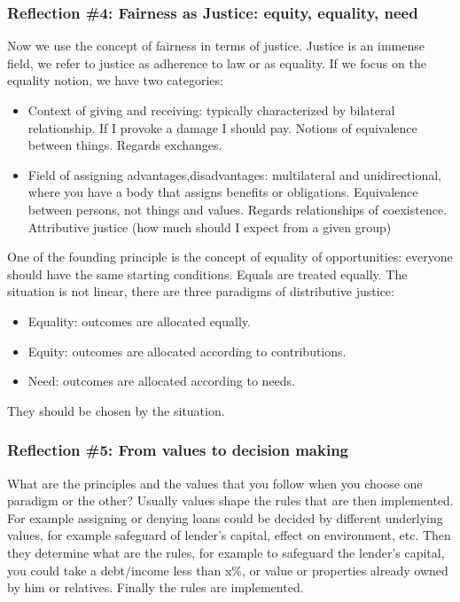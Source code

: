 \subsubsection{Reflection \#4: Fairness as Justice: equity, equality, need}
Now we use the concept of fairness in terms of justice. Justice is an immense field, we refer to justice as adherence to law or as equality. If we focus on the equality notion, we have two categories:
\begin{itemize}
    \item Context of giving and receiving: typically characterized by bilateral relationship. If I provoke a damage I should pay. Notions of equivalence between things. Regards exchanges. \item Field of assigning advantages,disadvantages: multilateral and unidirectional, where you have a body that assigns benefits or obligations. Equivalence between persons, not things and values. Regards relationships of coexistence. Attributive justice (how much should I expect from a given group)
\end{itemize}
One of the founding principle is the concept of equality of opportunities: everyone should have the same starting conditions. Equals are treated equally. The situation is not linear, there are three paradigms of distributive justice:
\begin{itemize}
    \item Equality: outcomes are allocated equally.
    \item Equity: outcomes are allocated according to contributions.
    \item Need: outcomes are allocated according to needs.
\end{itemize}
They should be chosen by the situation. 
\subsubsection{Reflection \#5: From values to decision making}
What are the principles and the values that you follow when you choose one paradigm or the other? Usually values shape the rules that are then implemented. For example assigning or denying loans could be decided by different underlying values, for example safeguard of lender's capital, effect on environment, etc. Then they determine what are the rules, for example to safeguard the lender's capital, you could take a debt/income less than x\%, or value or properties already owned by him or relatives. Finally the rules are implemented.

